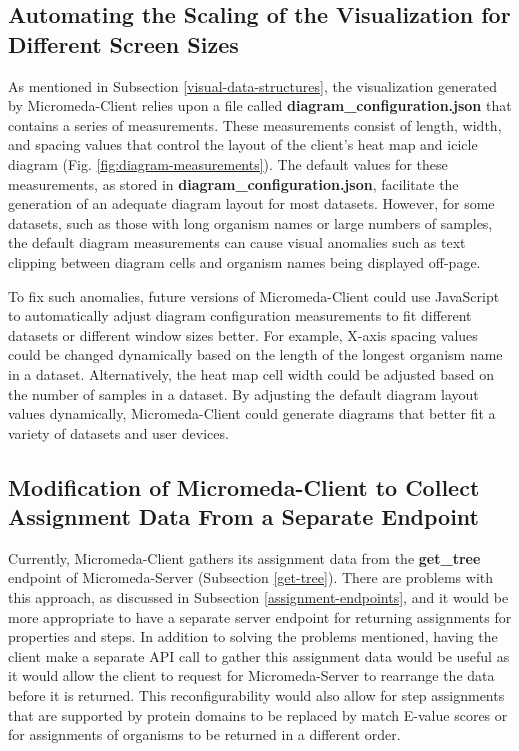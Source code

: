 \subsection{Automating the Scaling of the Visualization for Different Screen Sizes}

As mentioned in Subsection \ref{visual-data-structures}, the visualization generated by Micromeda-Client relies upon a file called \textbf{diagram\_configuration.json} that contains a series of measurements. These measurements consist of length, width, and spacing values that control the layout of the client's heat map and icicle diagram (Fig. \ref{fig:diagram-measurements}). The default values for these measurements, as stored in \textbf{diagram\_configuration.json}, facilitate the generation of an adequate diagram layout for most datasets. However, for some datasets, such as those with long organism names or large numbers of samples, the default diagram measurements can cause visual anomalies such as text clipping between diagram cells and organism names being displayed off-page.

To fix such anomalies, future versions of Micromeda-Client could use JavaScript to automatically adjust diagram configuration measurements to fit different datasets or different window sizes better. For example, X-axis spacing values could be changed dynamically based on the length of the longest organism name in a dataset. Alternatively, the heat map cell width could be adjusted based on the number of samples in a dataset. By adjusting the default diagram layout values dynamically, Micromeda-Client could generate diagrams that better fit a variety of datasets and user devices.

\subsection{Modification of Micromeda-Client to Collect Assignment Data From a Separate Endpoint}

Currently, Micromeda-Client gathers its assignment data from the \textbf{get\_tree} endpoint of Micromeda-Server (Subsection \ref{get-tree}). There are problems with this approach, as discussed in Subsection \ref{assignment-endpoints}, and it would be more appropriate to have a separate server endpoint for returning assignments for properties and steps. In addition to solving the problems mentioned, having the client make a separate API call to gather this assignment data would be useful as it would allow the client to request for Micromeda-Server to rearrange the data before it is returned. This reconfigurability would also allow for step assignments that are supported by protein domains to be replaced by match E-value scores or for assignments of organisms to be returned in a different order.

